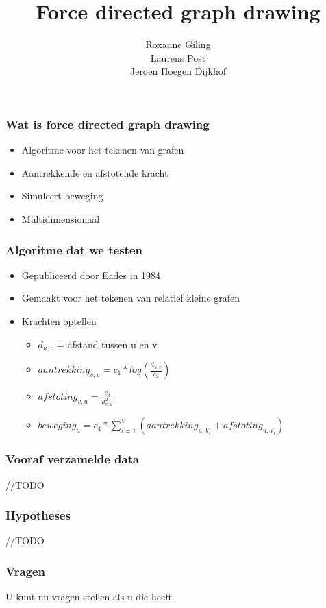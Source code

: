 \documentclass[11pt]{beamer}
\title{\textbf{Force directed graph drawing}}
\author{Roxanne Giling\\
		Laurens Post\\
		Jeroen Hoegen Dijkhof}
\date{}
\begin{document}
\begin{frame}
    \frametitle{\maketitle}
\end{frame}

\begin{frame}
    \frametitle{Wat is force directed graph drawing}
    \begin{itemize}
        \item{Algoritme voor het tekenen van grafen}
        \item{Aantrekkende en afstotende kracht}
        \item{Simuleert beweging}
        \item{Multidimensionaal}
    \end{itemize}
\end{frame}

\begin{frame}
    \frametitle{Algoritme dat we testen}
    \begin{itemize}
        \item{Gepubliceerd door Eades in 1984}
        \item{Gemaakt voor het tekenen van relatief kleine grafen}
        \item{Krachten optellen}
        \begin{itemize}
            \item{
                 $d_{u,v}$ = afstand tussen u en v
            }
            \item{
                \begin{math}
                    aantrekking_{v,u} = c_1 * log(\frac{d_{u,v}}{c_2})
                \end{math}
            }
            \item{
                \begin{math}
                    afstoting_{v,u} = \frac{c_3}{d_{v,u}^2}
                \end{math}
            }
            \item {
                \begin{math}
                    beweging_u = c_4 * \sum_{i=1}^V{(aantrekking_{u,V_i} + afstoting_{u,V_i})}
                \end{math}
            }
        \end{itemize}
    \end{itemize}
\end{frame}

\begin{frame}
    \frametitle{Vooraf verzamelde data}
    //TODO
\end{frame}

\begin{frame}
    \frametitle{Hypotheses}
    //TODO
\end{frame}

\begin{frame}
    \frametitle{Vragen}
    U kunt nu vragen stellen als u die heeft.
\end{frame}
\end{document}
